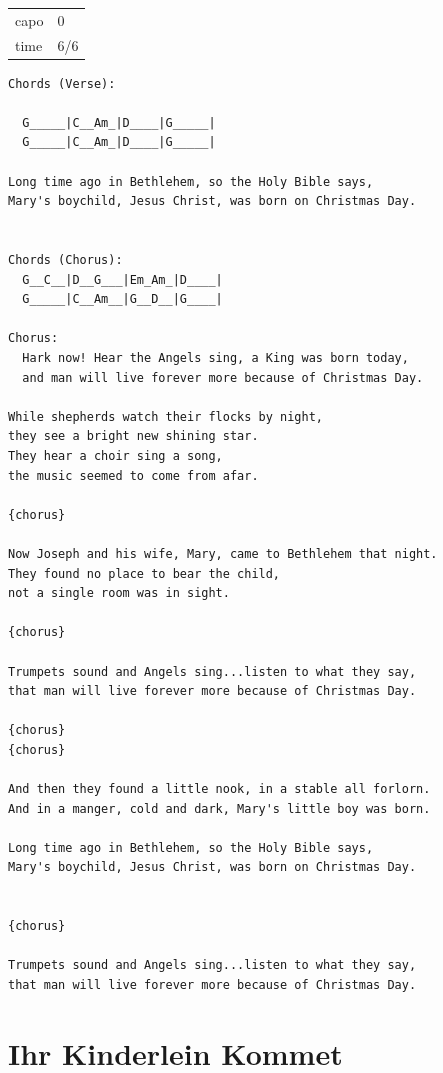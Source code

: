 \documentclass[
]{book}
\let\stdsection\section
\renewcommand\section{\clearpage\stdsection}
\begin{document}
\begin{longtable}[]{@{}ll@{}}
\toprule
\endhead
capo & 0\tabularnewline
time & 6/6\tabularnewline
\bottomrule
\end{longtable}

\begin{verbatim}
Chords (Verse):
  
  G_____|C__Am_|D____|G_____|
  G_____|C__Am_|D____|G_____|

Long time ago in Bethlehem, so the Holy Bible says,  
Mary's boychild, Jesus Christ, was born on Christmas Day. 


Chords (Chorus):
  G__C__|D__G___|Em_Am_|D____|
  G_____|C__Am__|G__D__|G____|

Chorus:
  Hark now! Hear the Angels sing, a King was born today, 
  and man will live forever more because of Christmas Day. 

While shepherds watch their flocks by night, 
they see a bright new shining star. 
They hear a choir sing a song,  
the music seemed to come from afar.  
  
{chorus} 

Now Joseph and his wife, Mary, came to Bethlehem that night. 
They found no place to bear the child,  
not a single room was in sight.      
  
{chorus}

Trumpets sound and Angels sing...listen to what they say, 
that man will live forever more because of Christmas Day. 

{chorus}
{chorus}
  
And then they found a little nook, in a stable all forlorn. 
And in a manger, cold and dark, Mary's little boy was born.

Long time ago in Bethlehem, so the Holy Bible says,  
Mary's boychild, Jesus Christ, was born on Christmas Day. 

  
{chorus}

Trumpets sound and Angels sing...listen to what they say, 
that man will live forever more because of Christmas Day.
\end{verbatim}

\hypertarget{weihnachten-ihr-kinderleit-kommet}{%
\section{Ihr Kinderlein Kommet}\label{weihnachten-ihr-kinderleit-kommet}}
\end{document}
